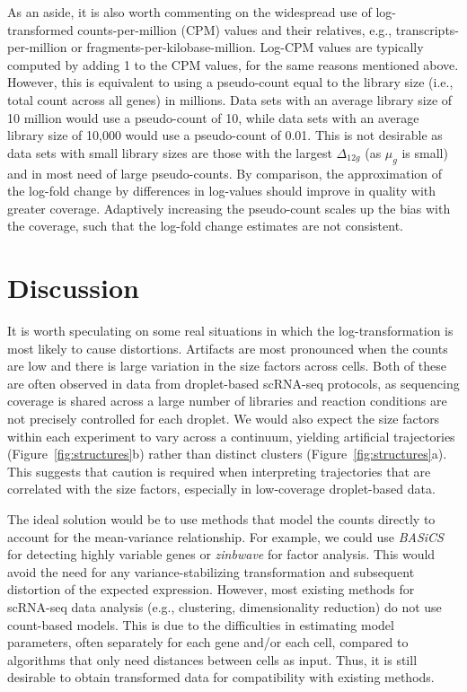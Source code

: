 \documentclass[10pt,letterpaper]{article}
\begin{document}
As an aside, it is also worth commenting on the widespread use of log-transformed counts-per-million (CPM) values and their relatives, e.g., transcripts-per-million or fragments-per-kilobase-million.
Log-CPM values are typically computed by adding 1 to the CPM values, for the same reasons mentioned above.
However, this is equivalent to using a pseudo-count equal to the library size (i.e., total count across all genes) in millions.
Data sets with an average library size of 10 million would use a pseudo-count of 10, while data sets with an average library size of 10,000 would use a pseudo-count of 0.01.
This is not desirable as data sets with small library sizes are those with the largest $\Delta_{12g}$ (as $\mu_g$ is small) and in most need of large pseudo-counts.
By comparison, the approximation of the log-fold change by differences in log-values should improve in quality with greater coverage.
Adaptively increasing the pseudo-count scales up the bias with the coverage, such that the log-fold change estimates are not consistent.

\section{Discussion}
It is worth speculating on some real situations in which the log-transformation is most likely to cause distortions.
Artifacts are most pronounced when the counts are low and there is large variation in the size factors across cells.
Both of these are often observed in data from droplet-based scRNA-seq protocols, as sequencing coverage is shared across a large number of libraries and reaction conditions are not precisely controlled for each droplet.
We would also expect the size factors within each experiment to vary across a continuum, yielding artificial trajectories (Figure~\ref{fig:structures}b) rather than distinct clusters (Figure~\ref{fig:structures}a).
This suggests that caution is required when interpreting trajectories that are correlated with the size factors, especially in low-coverage droplet-based data.

The ideal solution would be to use methods that model the counts directly to account for the mean-variance relationship.
For example, we could use \textit{BASiCS} \cite{vallejos2016beyond} for detecting highly variable genes or \textit{zinbwave} \cite{risso2018general} for factor analysis.
This would avoid the need for any variance-stabilizing transformation and subsequent distortion of the expected expression.
However, most existing methods for scRNA-seq data analysis (e.g., clustering, dimensionality reduction) do not use count-based models.
This is due to the difficulties in estimating model parameters, often separately for each gene and/or each cell,
compared to algorithms that only need distances between cells as input.
Thus, it is still desirable to obtain transformed data for compatibility with existing methods.
\end{document}
